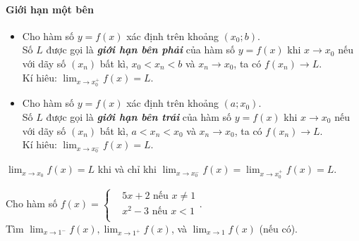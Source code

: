 \paragraph{Giới hạn một bên}
\begin{dn}
\begin{itemize}
\item	Cho hàm số $y = f(x)$ xác định trên khoảng $\left(x_0; b \right)$. \\
Số $L$ được gọi là \textbf{\textit{giới hạn bên phải}} của hàm số $y = f(x)$ khi $x \rightarrow x_0$ nếu với dãy số $\left(x_n \right)$ bất kì, $x_0 < x_n < b$ và $x_n \rightarrow x_0$, ta có $f\left(x_n \right) \rightarrow L$. \\
Kí hiêu: $\displaystyle \lim_{x \to x_0^+} f(x) = L$.
\item	Cho hàm số $y = f(x)$ xác định trên khoảng $\left(a; x_0 \right)$. \\
Số $L$ được gọi là \textbf{\textit{giới hạn bên trái}} của hàm số $y = f(x)$ khi $x \rightarrow x_0$ nếu với dãy số $\left(x_n \right)$ bất kì, $a < x_n < x_0$ và $x_n \rightarrow x_0$, ta có $f\left(x_n \right) \rightarrow L$. \\
Kí hiêu: $\displaystyle \lim_{x \to x_0^-} f(x) = L$.
\end{itemize}
\end{dn}
\begin{dl}
$\displaystyle \lim_{x \to x_0} f(x) = L$ khi và chỉ khi $\displaystyle \lim_{x \to x_0^-} f(x) = \displaystyle \lim_{x \to x_0^+} f(x) = L$.
\end{dl}
\begin{vd}%
Cho hàm số $f(x)=\left\{\begin{aligned}   & {5x+2} \text{ nếu } x \neq 1 \\ 
& {x^2-3} \text{ nếu } x <1 \\ \end{aligned}\right.$. \\
Tìm $\displaystyle \lim_{x \to 1^-}f(x), \displaystyle \lim_{x \to 1^+}f(x)$, và $\displaystyle \lim_{x \to 1}f(x)$ (nếu có).
\end{vd}
